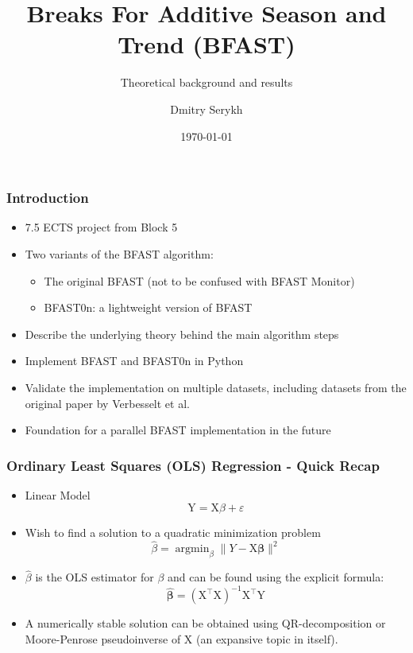 \documentclass[9pt]{beamer}
\title{Breaks For Additive Season and Trend (BFAST)}
\subtitle{Theoretical background and results}
\institute{Department of Computer Science}
\author{Dmitry Serykh}
\date{\today}
\begin{document}
\frame[plain]{\titlepage}

\begin{frame}
\frametitle{Introduction}
\begin{itemize}
\item 7.5 ECTS project from Block 5
\item Two variants of the BFAST algorithm:
  \begin{itemize}
  \item The original BFAST (not to be confused with BFAST Monitor)
  \item BFAST0n: a lightweight version of BFAST
  \end{itemize}
\item Describe the underlying theory behind the main algorithm steps
\item Implement BFAST and BFAST0n in Python
\item Validate the implementation on multiple datasets, including datasets from
  the original paper by Verbesselt et al.
\item Foundation for a parallel BFAST implementation in the future
\end{itemize}
\end{frame}

\begin{frame}
  \frametitle{Ordinary Least Squares (OLS) Regression - Quick Recap}
  \begin{itemize}
    \item Linear Model
      \[
      \mathrm{Y} = \mathrm{X}\beta + \varepsilon
      \]
    \item Wish to find a solution to a quadratic minimization problem
      \[
      \hat{\beta} = \operatorname{argmin}_{\beta} \|Y-\mathrm{X} \boldsymbol{\beta}\|^{2}
      \]
    \item $\hat{\beta}$ is the OLS estimator for $\beta$ and can be found using the explicit formula:
      \[
      \hat{\boldsymbol{\beta}}=\left(\mathrm{X}^{\top} \mathrm{X}\right)^{-1}\mathrm{X}^{\top} \mathrm{Y}
      \]
    \item A numerically stable solution can be obtained using QR-decomposition or Moore-Penrose
      pseudoinverse of $\mathrm{X}$ (an expansive topic in itself).
  \end{itemize}
\end{frame}
\end{document}
